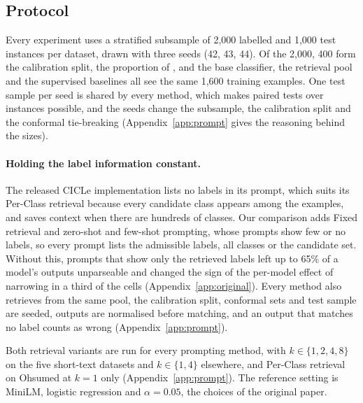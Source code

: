 \subsection{Protocol}
\label{sec:protocol}

Every experiment uses a stratified subsample of 2,000 labelled and 1,000 test instances per dataset, drawn with three seeds (42, 43, 44).
Of the 2,000, 400 form the calibration split, the proportion of \citet{randl2024cicle}, and the base classifier, the retrieval pool and the supervised baselines all see the same 1,600 training examples.
One test sample per seed is shared by every method, which makes paired tests over instances possible, and the seeds change the subsample, the calibration split and the conformal tie-breaking (Appendix~\ref{app:prompt} gives the reasoning behind the sizes).

\paragraph{Holding the label information constant.}
The released CICLe implementation lists no labels in its prompt, which suits its Per-Class retrieval because every candidate class appears among the examples, and saves context when there are hundreds of classes.
Our comparison adds Fixed retrieval and zero-shot and few-shot prompting, whose prompts show few or no labels, so every prompt lists the admissible labels, all classes or the candidate set.
Without this, prompts that show only the retrieved labels left up to 65\% of a model's outputs unparseable and changed the sign of the per-model effect of narrowing in a third of the cells (Appendix~\ref{app:original}). %
Every method also retrieves from the same pool, the calibration split, conformal sets and test sample are seeded, outputs are normalised before matching, and an output that matches no label counts as wrong (Appendix~\ref{app:prompt}).

Both retrieval variants are run for every prompting method, with $k \in \{1, 2, 4, 8\}$ on the five short-text datasets and $k \in \{1, 4\}$ elsewhere, and Per-Class retrieval on Ohsumed at $k = 1$ only (Appendix~\ref{app:prompt}).
The reference setting is MiniLM, logistic regression and $\alpha = 0.05$, the choices of the original paper.


